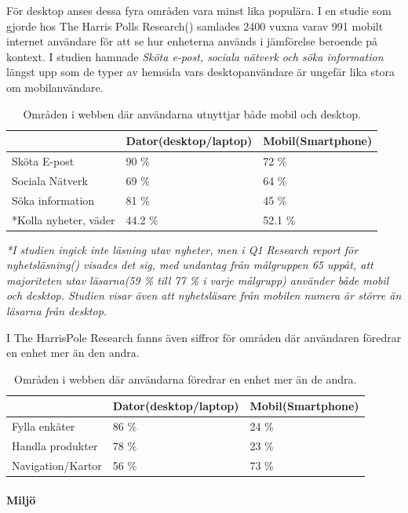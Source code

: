 \documentclass[11pt]{article}
\begin{document}
För desktop anses dessa fyra områden vara minst lika populära. I en studie som gjorde hos The Harris Polls Research(\cite{harrispoll}) samlades 2400 vuxna varav 991 mobilt internet användare för att se hur enheterna används i jämförelse beroende på kontext. I studien hamnade \textit{Sköta e-post, sociala nätverk och söka information} längst upp som de typer av hemsida vars desktopanvändare är ungefär lika stora om mobilanvändare.
\\
\begin{table}[H]
	\centering
	\begin{tabular}{|p{4cm}|p{4cm}|p{4cm}|}
	\hline
	~&Dator(desktop/laptop)&Mobil(Smartphone)\\ \hline
	Sköta E-post &90 \%&72 \%\\ \hline
	Sociala Nätverk&69 \%&64 \%\\ \hline
	Söka information&81 \%&45 \%\\ \hline
	*Kolla nyheter, väder&44.2 \%&52.1 \%\\ \hline
	\end{tabular}
    \caption {Områden i webben där användarna utnyttjar både mobil och desktop.}
\end{table}
\textit{*I studien ingick inte läsning utav nyheter, men i Q1 Research report för nyhetsläsning(\cite{q1research}) visades det sig, med undantag från målgruppen 65 uppåt, att majoriteten utav läsarna(59 \% till 77 \% i varje målgrupp) använder både mobil och desktop. Studien visar även att nyhetsläsare från mobilen numera är större än läsarna från desktop.}

I The HarrisPole Research fanns även siffror för områden där användaren föredrar en enhet mer än den andra.

\begin{table}[H]
	\centering
	\begin{tabular}{|p{4cm}|p{4cm}|p{4cm}|}
	\hline
	~&Dator(desktop/laptop)&Mobil(Smartphone)\\ \hline
	Fylla enkäter &86 \%&24 \%\\ \hline
	Handla produkter&78 \%&23 \%\\ \hline
	Navigation/Kartor&56 \%&73 \%\\ \hline
	\end{tabular}
    \caption {Områden i webben där användarna föredrar en enhet mer än de andra.}
\end{table}

\paragraph{Miljö} \mbox{}
\end{document}

